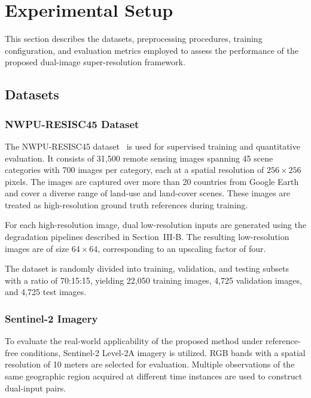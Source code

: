 \documentclass[conference]{IEEEtran}
\begin{document}
\section{Experimental Setup}

This section describes the datasets, preprocessing procedures, training configuration, and evaluation metrics employed to assess the performance of the proposed dual-image super-resolution framework.

\subsection{Datasets}

\subsubsection{NWPU-RESISC45 Dataset}

The NWPU-RESISC45 dataset~\cite{cheng2017nwpu} is used for supervised training and quantitative evaluation. It consists of 31,500 remote sensing images spanning 45 scene categories with 700 images per category, each at a spatial resolution of $256 \times 256$ pixels. The images are captured over more than 20 countries from Google Earth and cover a diverse range of land-use and land-cover scenes. These images are treated as high-resolution ground truth references during training.

For each high-resolution image, dual low-resolution inputs are generated using the degradation pipelines described in Section~III-B. The resulting low-resolution images are of size $64 \times 64$, corresponding to an upscaling factor of four.

The dataset is randomly divided into training, validation, and testing subsets with a ratio of 70:15:15, yielding 22,050 training images, 4,725 validation images, and 4,725 test images.

\subsubsection{Sentinel-2 Imagery}

To evaluate the real-world applicability of the proposed method under reference-free conditions, Sentinel-2 Level-2A imagery is utilized. RGB bands with a spatial resolution of 10 meters are selected for evaluation. Multiple observations of the same geographic region acquired at different time instances are used to construct dual-input pairs.
\end{document}
